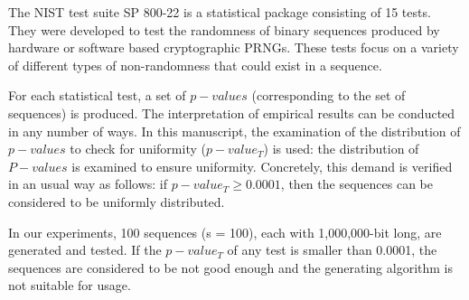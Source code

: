 The NIST test suite SP 800-22 is a statistical package consisting of 15 tests. They were developed to test the randomness of binary sequences produced by hardware or software based cryptographic PRNGs. These tests focus on a variety of different types of non-randomness that could exist in a sequence. 


For each statistical test, a set of $p-values$ (corresponding to the set of sequences) is produced. The interpretation of empirical results can be conducted in any number of ways. In this manuscript, the examination of the distribution of $p-values$ to check for uniformity ($p-value_{T}$) is used:
the distribution of $P-values$ is examined to ensure uniformity. 
Concretely, this demand is verified in an usual way as follows: if $p-value_{T} \geqslant 0.0001$, then the sequences can be considered to be uniformly distributed.

In our experiments, 100 sequences (s = 100), each with 1,000,000-bit long, are generated and tested. If the $p-value_{T}$ of any test is smaller than 0.0001, the sequences are considered to be not good enough and the generating algorithm is not suitable for usage.

